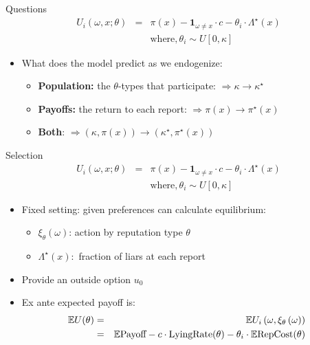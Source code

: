 \documentclass{beamer}
\begin{document}
\begin{frame}{Questions}
    \begin{eqnarray*}
    U_{i}(\omega,x;\theta) & = & \pi(x)-\boldsymbol{1}_{\omega\not=x}\cdot c-\theta_{i}\cdot\Lambda^{\star}(x)\\
     & \text{} & \text{where},\theta_{i}\sim U[0,\kappa]
    \end{eqnarray*}

    \begin{itemize}
        \item What does the model predict as we endogenize:
            \begin{itemize}
                \item \textbf{Population:} the $\theta$-types that participate: $\Rightarrow\kappa\rightarrow\kappa^{\star}$
                \item \textbf{Payoffs:} the return to each report: $\Rightarrow\pi(x)\rightarrow\pi^{\star}(x)$
                \item \textbf{Both}: $\Rightarrow\left(\kappa,\pi\left(x\right)\right)\rightarrow\left(\kappa^{\star},\pi^{\star}\left(x\right)\right)$
            \end{itemize}
    \end{itemize}
\end{frame}

\begin{frame}{Selection}
    \begin{eqnarray*}
    U_{i}(\omega,x;\theta) & = & \pi(x)-\boldsymbol{1}_{\omega\not=x}\cdot c-\theta_{i}\cdot\Lambda^{\star}(x)\\
     & \text{} & \text{where},\theta_{i}\sim U[0,\kappa]
    \end{eqnarray*}
    
    \begin{itemize}
        \item Fixed setting: given preferences can calculate equilibrium:
            \begin{itemize}
                \item $\xi_{\theta}(\omega)$: action by reputation type $\theta$
                \item $\Lambda^{\star}(x):$ fraction of liars at each report
            \end{itemize}
        \item Provide an outside option $u_{0}$
        \item Ex ante expected payoff is:
        \begin{eqnarray*}
            \mathbb{E}U(\theta) & = & \mathbb{E}U_{i}\left(\omega,\xi_{\theta}\left(\omega\right)\right)\\
         & = & \mathbb{E}\text{Payoff}-c\cdot\text{LyingRate}(\theta)-\theta_{i}\cdot\text{\ensuremath{\mathbb{E}}RepCost}(\theta)
        \end{eqnarray*}
    \end{itemize}
\end{frame}
\end{document}

